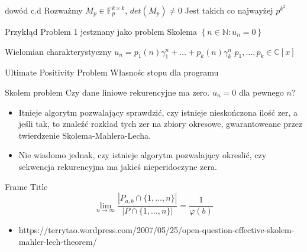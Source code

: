 \documentclass{beamer}
\theoremstyle{definition}
\begin{document}
\begin{frame}{dowód c.d}
    Rozważmy $M_p \in \mathbb{F}_p^{k\times k} $, $det(M_p) \neq 0$
    Jest takich co najwayżej $p^{k^{2}}$
\end{frame}

\begin{frame}{Przykłąd}
Problem 1 jestznany jako problem Skolema 
    $\left\{n \in \mathbb{N}: u_{n}=0\right\}$
\end{frame}
    
\begin{frame}{Wielomian charakterystyczny}
    $u_{n}=p_{1}(n) \gamma_{1}^{n}+\ldots+p_{k}(n) \gamma_{k}^{n}$
    $p_{1}, \ldots, p_{k} \in \mathbb{C}[x]$
\end{frame}
    
\begin{frame}{Ultimate Positivity Problem}
    Własnośc stopu dla programu
    
\end{frame}



\begin{frame}{Skolem problem}
    Czy dane liniowe rekurencyjne ma zero. 
    $u_n = 0$ dla pewnego $n$?
    \begin{itemize}
        \item Itnieje algorytm pozwalający sprawdzić, czy istnieje nieskończona ilość zer, a jeśli tak, to znaleźć rozkład tych zer na zbiory okresowe, gwarantoweane przez twierdzenie Skolema-Mahlera-Lecha. 
        \item Nie wiadomo jednak, czy istnieje algorytm pozwalający okreslić, czy sekwencja rekurencyjna ma jakieś nieperidoczyne zera. 
    \end{itemize}
\end{frame}


\begin{frame}{Frame Title}
    $$\lim _{n \rightarrow \infty} \frac{\left|P_{a, b} \cap\{1, \ldots, n\}\right|}{|P \cap\{1, \ldots, n\}|}=\frac{1}{\varphi(b)}$$
\end{frame}

\begin{frame}


\begin{itemize}
    \item https://terrytao.wordpress.com/2007/05/25/open-question-effective-skolem-mahler-lech-theorem/
\end{itemize}
\end{frame}
\end{document}

